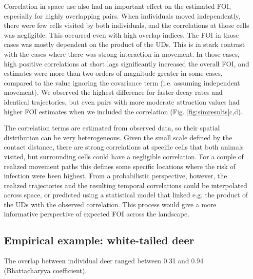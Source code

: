 \documentclass[letterpaper]{article}
\begin{document}
Correlation in space use also had an important effect on the estimated FOI, especially for highly overlapping pairs. 
When individuals moved independently, there were few cells visited by both individuals, and the correlations at those cells was negligible. This occurred even with high overlap indices. The FOI in those cases was mostly dependent on the product of the UDs. %
This is in stark contrast with the cases where there was strong interaction in movement. 
In those cases, high positive correlations at short lags significantly increased the overall FOI, and estimates were more than two orders of magnitude greater in some cases, compared to the value ignoring the covariance term (i.e. assuming independent movement). We observed the highest difference for faster decay rates and identical trajectories, but even pairs with more moderate attraction values had higher FOI estimates when we included the correlation (Fig. \ref{fig:simresults}c,d).

The correlation terms are estimated from observed data, so their spatial distribution can be very heterogeneous. Given the small scale defined by the contact distance, there are strong correlations at  specific cells that both animals visited, but surrounding cells could have a negligible correlation. 
For a couple of realized movement paths this defines some specific locations where the risk of infection were been highest. From a probabilistic perspective, however, the realized trajectories and the resulting temporal correlations could be interpolated across space, or predicted using a statistical model that linked e.g. the product of the UDs with the observed correlation. This process would give a more informative perspective of expected FOI across the landscape. 



\subsection*{Empirical example: white-tailed deer}
The overlap between individual deer ranged between 0.31 and 0.94 (Bhattacharyya coefficient). 
\end{document}
